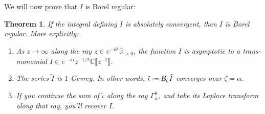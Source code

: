 \documentclass{article}
\newcommand{\R}{\mathbb{R}}
\newcommand{\C}{\mathbb{C}}
\newcommand*{\defeq}{\mathrel{\vcenter{\baselineskip0.5ex \lineskiplimit0pt
                     \hbox{\scriptsize.}\hbox{\scriptsize.}}}%
                     =}
\newcommand{\borel}{\mathcal{B}}
\theoremstyle{definition}
\theoremstyle{plain}
\newtheorem{theorem}{Theorem}[section]
\begin{document}
We will now prove that $I$ is Borel regular:
\begin{theorem}\label{thm:maxim-proof}
If the integral defining $I$ is absolutely convergent, then $I$ is Borel regular. More explicitly: 
\begin{enumerate}
\item\label{part-1} As $z \to \infty$ along the ray $z \in e^{-i\theta}\,\R_{>0}$, the function $I$ is asymptotic to a trans-monomial $\tilde{I}\in e^{-z \alpha} z^{-1/2} \C\llbracket z^{-1}\rrbracket$.
\item\label{part-2} The series $\tilde{I}$ is $1$-Gevrey. In other words, $\tilde{\iota} \defeq \borel_\zeta \tilde{I}$ converges near $\zeta=\alpha$.
\item\label{part-3} If you continue the sum of $\tilde{\iota}$ along the ray $\Gamma_\alpha^\theta$, and take its Laplace transform along that ray, you'll recover $I$.
\end{enumerate}
\end{theorem}
\end{document}
